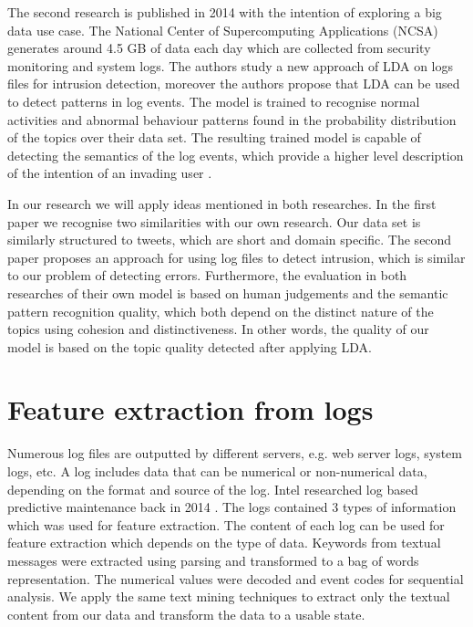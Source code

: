 \newpage
The second research is published in 2014 with the intention of exploring a big data use case. The National Center of Supercomputing Applications (NCSA) generates around 4.5 GB of data each day which are collected from security monitoring and system logs. The authors study a new approach of LDA on logs files for intrusion detection, moreover the authors propose that LDA can be used to detect patterns in log events. The model is trained to recognise normal activities and abnormal behaviour patterns found in the probability distribution of the topics over their data set. The resulting trained model is capable of detecting the semantics of the log events, which provide a higher level description of the intention of an invading user \cite{Jingwei2014KnowledgeLDA}. 

In our research we will apply ideas mentioned in both researches. In the first paper we recognise two similarities with our own research. Our data set is similarly structured to tweets, which are short and domain specific. The second paper proposes an approach for using log files to detect intrusion, which is similar to our problem of detecting errors. Furthermore, the evaluation in both researches of their own model is based on human judgements and the semantic pattern recognition quality, which both depend on the distinct nature of the topics using cohesion and distinctiveness. In other words, the quality of our model is based on the topic quality detected after applying LDA.

\section{Feature extraction from logs}\label{research:featureextraction}
Numerous log files are outputted by different servers, e.g. web server logs, system logs, etc. A log includes data that can be numerical or non-numerical data, depending on the format and source of the log. Intel researched log based predictive maintenance back in 2014 \cite{Sipos2014Log-basedMaintenance}. The logs contained 3 types of information which was used for feature extraction. 
The content of each log can be used for feature extraction which depends on the type of data.
Keywords from textual messages were extracted using parsing and transformed to a bag of words representation. The numerical values were decoded and event codes for sequential analysis. We apply the same text mining techniques to extract only the textual content from our data and transform the data to a usable state.


